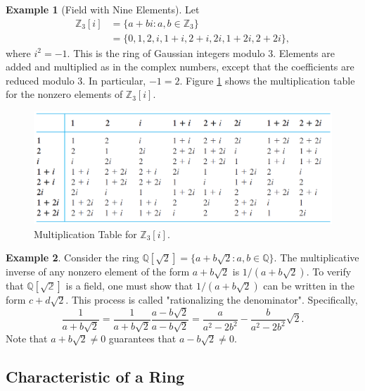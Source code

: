 \documentclass{article}
\theoremstyle{definition}
\newtheorem{definition}{Definition}[section]
\newtheorem{example}{Example}[section]
\begin{document}
\begin{example}[Field with Nine Elements]
    Let 
    \begin{align*}
        \mathbb{Z}_3[i]&=\{a+bi:a,b\in\mathbb{Z}_3\} \\
        &=\{0,1,2,i,1+i,2+i,2i,1+2i,2+2i\},
    \end{align*}
    where $i^2=-1$. This is the ring of Gaussian integers modulo 3. Elements are added and multiplied as in the complex numbers, except that the coefficients are reduced modulo 3. In particular, $-1=2$. Figure \ref{Z_3[i]-multiplication-table} shows the multiplication table for the nonzero elements of $\mathbb{Z}_3[i]$.
    
    \begin{figure}[!htbp]
        \centering
        \includegraphics[width=0.9\linewidth]{figures/Z_3[i]-multiplication-table.png}
        \caption{Multiplication Table for $\mathbb{Z}_3[i]$.}
        \label{Z_3[i]-multiplication-table}
    \end{figure}
\end{example}

\begin{example}
    Consider the ring $\mathbb{Q}[\sqrt{2}]=\{a+b\sqrt{2}:a,b\in\mathbb{Q}\}$. The multiplicative inverse of any nonzero element of the form $a+b\sqrt{2}$ is $1/(a+b\sqrt{2})$. To verify that $\mathbb{Q[\sqrt{2}]}$ is a field, one must show that $1/(a+b\sqrt{2})$ can be written in the form $c+d\sqrt{2}$. This process is called "rationalizing the denominator". Specifically,
    \begin{equation*}
        \frac{1}{a+b\sqrt{2}}=\frac{1}{a+b\sqrt{2}}\frac{a-b\sqrt{2}}{a-b\sqrt{2}}=\frac{a}{a^2-2b^2}-\frac{b}{a^2-2b^2}\sqrt{2}.
    \end{equation*}
    Note that $a+b\sqrt{2}\neq0$ guarantees that $a-b\sqrt{2}\neq0$.
\end{example}

\subsection{Characteristic of a Ring}
\end{document}
